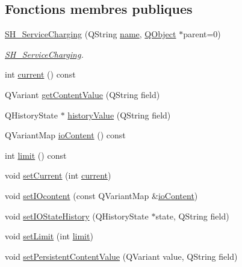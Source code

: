 \subsection*{Fonctions membres publiques}
\begin{DoxyCompactItemize}
\item 
\hyperlink{classSH__ServiceCharging_afa5273d046049b1c2b020a6a19a8290b}{S\-H\-\_\-\-Service\-Charging} (Q\-String \hyperlink{classSH__NamedObject_a9f686c6f2a5bcc08ad03d0cee0151f0f}{name}, \hyperlink{classQObject}{Q\-Object} $\ast$parent=0)
\begin{DoxyCompactList}\small\item\em \hyperlink{classSH__ServiceCharging}{S\-H\-\_\-\-Service\-Charging}. \end{DoxyCompactList}\item 
int \hyperlink{classSH__LoopingInOutStateMachine_afce58401195a4941b1939c46f1caa23b}{current} () const 
\item 
Q\-Variant \hyperlink{classSH__InOutStateMachine_aa1a3bd3c0ea8a59b9bc916dc718eb9ca}{get\-Content\-Value} (Q\-String field)
\item 
Q\-History\-State $\ast$ \hyperlink{classSH__InOutStateMachine_af71bfdb3b59b7bf2763588b513b4205f}{history\-Value} (Q\-String field)
\item 
Q\-Variant\-Map \hyperlink{classSH__InOutStateMachine_aaca105fbd5f5cc3bac115389ad3694c5}{io\-Content} () const 
\item 
int \hyperlink{classSH__LoopingInOutStateMachine_aa82afb8de3acbd0953bdf468f697d777}{limit} () const 
\item 
void \hyperlink{classSH__LoopingInOutStateMachine_aed2f3a75029856cbf28cae78040e17c1}{set\-Current} (int \hyperlink{classSH__LoopingInOutStateMachine_afce58401195a4941b1939c46f1caa23b}{current})
\item 
void \hyperlink{classSH__InOutStateMachine_a8271a7ec7d5f6502449dd3b4da5f4155}{set\-I\-Ocontent} (const Q\-Variant\-Map \&\hyperlink{classSH__InOutStateMachine_aaca105fbd5f5cc3bac115389ad3694c5}{io\-Content})
\item 
void \hyperlink{classSH__InOutStateMachine_acbcce2c4300af1634d928b30e5e9be1c}{set\-I\-O\-State\-History} (Q\-History\-State $\ast$state, Q\-String field)
\item 
void \hyperlink{classSH__LoopingInOutStateMachine_a6dbf2fbcc6524bba5a70baadb8d61be4}{set\-Limit} (int \hyperlink{classSH__LoopingInOutStateMachine_a7b61682544bd06b52020df3e0d801d21}{limit})
\item 
void \hyperlink{classSH__LoopingInOutStateMachine_a99686121d80e3de4c64bebb1d5890ac0}{set\-Persistent\-Content\-Value} (Q\-Variant value, Q\-String field)

\end{DoxyCompactItemize}

